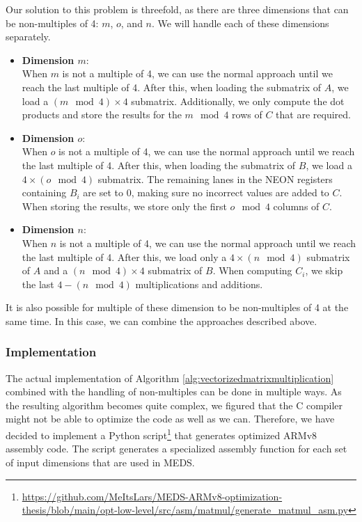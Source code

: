 \documentclass[11pt,a4paper]{report}
\theoremstyle{definition}
\begin{document}
Our solution to this problem is threefold, as there are three dimensions that can be non-multiples of 4: $m$, $o$, and $n$. We will handle each of these dimensions separately.
\begin{itemize}
  \item \textbf{Dimension $m$}:\\
  When $m$ is not a multiple of 4, we can use the normal approach until we reach the last multiple of 4. After this, when loading the submatrix of $A$, we load a $(m \mod 4) \times 4$ submatrix. Additionally, we only compute the dot products and store the results for the $m \mod 4$ rows of $C$ that are required.
  \item \textbf{Dimension $o$}:\\
  When $o$ is not a multiple of 4, we can use the normal approach until we reach the last multiple of 4. After this, when loading the submatrix of $B$, we load a $4 \times (o \mod 4)$ submatrix. The remaining lanes in the NEON registers containing $B_i$ are set to 0, making sure no incorrect values are added to $C$. When storing the results, we store only the first $o \mod 4$ columns of $C$.
  \item \textbf{Dimension $n$}:\\
  When $n$ is not a multiple of 4, we can use the normal approach until we reach the last multiple of 4. After this, we load only a $4 \times (n \mod 4)$ submatrix of $A$ and a $(n \mod 4) \times 4$ submatrix of $B$. When computing $C_i$, we skip the last $4 - (n \mod 4)$ multiplications and additions.
\end{itemize}
It is also possible for multiple of these dimension to be non-multiples of 4 at the same time. In this case, we can combine the approaches described above.

\subsubsection{Implementation}
The actual implementation of Algorithm \ref{alg:vectorizedmatrixmultiplication} combined with the handling of non-multiples can be done in multiple ways. As the resulting algorithm becomes quite complex, we figured that the C compiler might not be able to optimize the code as well as we can. Therefore, we have decided to implement a Python script\footnote{\url{https://github.com/MeItsLars/MEDS-ARMv8-optimization-thesis/blob/main/opt-low-level/src/asm/matmul/generate\_matmul\_asm.py}} that generates optimized ARMv8 assembly code. The script generates a specialized assembly function for each set of input dimensions that are used in MEDS.
\end{document}
